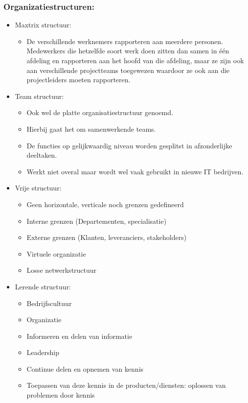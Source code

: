 \documentclass[12pt]{article}
\begin{document}
\subsubsection{Organizatiestructuren:}
\begin{itemize}
    \item Maxtrix structuur:\begin{itemize}
        \item De verschillende werknemers rapporteren aan meerdere personen. Medewerkers die hetzelfde soort werk doen zitten dan samen in één afdeling en rapporteren aan het hoofd van die afdeling, maar ze zijn ook aan verschillende projectteams toegewezen waardoor ze ook aan die projectleiders moeten rapporteren.
    \end{itemize}
    \item Team structuur:\begin{itemize}
        \item Ook wel de platte organisatiestructuur genoemd.
        \item Hierbij gaat het om samenwerkende teams.
        \item De functies op gelijkwaardig niveau worden gesplitst in afzonderlijke deeltaken.
        \item[] Werkt niet overal maar wordt wel vaak gebruikt in nieuwe IT bedrijven.
    \end{itemize}
    \item Vrije structuur:\begin{itemize}
        \item Geen horizontale, verticale noch grenzen gedefineerd
        \item Interne grenzen (Departementen, specialisatie)
        \item Externe grenzen (Klanten, leveranciers, stakeholders)
        \item Virtuele organizatie 
        \item Losse netwerkstructuur
    \end{itemize}
    \item Lerende structuur:\begin{itemize}
        \item Bedrijfscultuur
        \item Organizatie
        \item Informeren en delen van informatie
        \item Leadership
        \item Continue delen en opnemen van kennis
        \item Toepassen van deze kennis in de producten/diensten: oplossen van problemen door kennis

\end{itemize}
\end{itemize}
\end{document}
